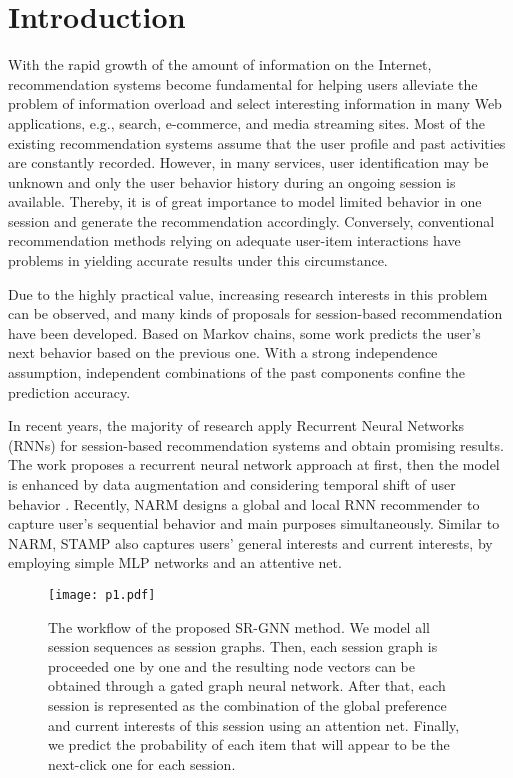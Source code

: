 \documentclass[letterpaper]{article} \usepackage{cite}
\begin{document}
\section{Introduction}

With the rapid growth of the amount of information on the Internet, recommendation systems become fundamental for helping users alleviate the problem of information overload and select interesting information in many Web applications, e.g., search, e-commerce, and media streaming sites. Most of the existing recommendation systems assume that the user profile and past activities are constantly recorded. However, in many services, user identification may be unknown and only the user behavior history during an ongoing session is available. Thereby, it is of great importance to model limited behavior in one session and generate the recommendation accordingly. Conversely, conventional recommendation methods relying on adequate user-item interactions have problems in yielding accurate results under this circumstance.

Due to the highly practical value, increasing research interests in this problem can be observed, and many kinds of proposals for session-based recommendation have been developed. Based on Markov chains, some work \cite{Shani:2002:MRS:2073876.2073930,rendle2010factorizing} predicts the user's next behavior based on the previous one. With a strong independence assumption, independent combinations of the past components confine the prediction accuracy.

In recent years, the majority of research \cite{DBLP:journals/corr/HidasiKBT15,Tan:2016:IRN:2988450.2988452,Tuan:2017:CNS:3109859.3109900,Li:2017:NAS:3132847.3132926} apply Recurrent Neural Networks (RNNs) for session-based recommendation systems and obtain promising results. The work \cite{DBLP:journals/corr/HidasiKBT15} proposes a recurrent neural network approach at first, then the model is enhanced by data augmentation and considering temporal shift of user behavior \cite{Tan:2016:IRN:2988450.2988452}. Recently, NARM \cite{Li:2017:NAS:3132847.3132926} designs a global and local RNN recommender to capture user's sequential behavior and main purposes simultaneously. Similar to NARM, STAMP \cite{Liu:2018:SSA:3219819.3219950} also captures users' general interests and current interests, by employing simple MLP networks and an attentive net.

\begin{figure*}[h]
	\centering
	\texttt{[image: p1.pdf]}
	\caption{The workflow of the proposed SR-GNN method. We model all session sequences as session graphs. Then, each session graph is proceeded one by one and the resulting node vectors can be obtained through a gated graph neural network. After that, each session is represented as the combination of the global preference and current interests of this session using an attention net. Finally, we predict the probability of each item that will appear to be the next-click one for each session.}
	\label{fig:workflow}
\end{figure*}
\end{document}
